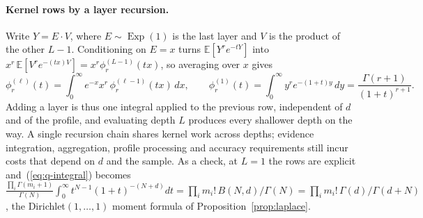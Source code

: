 \documentclass[anon]{alt2027}
\newcommand{\Exp}{\operatorname{Exp}}
\newcommand{\E}{\mathbb{E}}
\renewcommand{\eqref}[1]{(\ref{#1})}
\begin{document}
\paragraph{Kernel rows by a layer recursion.} Write $Y=E\cdot V$, where $E\sim\Exp(1)$ is the last layer and $V$ is the product of the other $L-1$. Conditioning on $E=x$ turns $\E[Y^re^{-tY}]$ into $x^r\,\E[V^re^{-(tx)V}]=x^r\phi^{(L-1)}_r(tx)$, so averaging over $x$ gives
\begin{equation}
\label{eq:phi-recursion}
\phi^{(\ell)}_r(t)=\int_0^\infty e^{-x}x^r\,\phi^{(\ell-1)}_r(tx)\,dx,\qquad \phi^{(1)}_r(t)=\int_0^\infty y^re^{-(1+t)y}\,dy=\frac{\Gamma(r+1)}{(1+t)^{r+1}} .
\end{equation}
Adding a layer is thus one integral applied to the previous row, independent of $d$ and of the profile, and evaluating depth $L$ produces every shallower depth on the way. A single recursion chain shares kernel work across depths; evidence integration, aggregation, profile processing and accuracy requirements still incur costs that depend on $d$ and the sample. As a check, at $L=1$ the rows are explicit and~\eqref{eq:q-integral} becomes $\frac{\prod_i\Gamma(m_i+1)}{\Gamma(N)}\int_0^\infty t^{N-1}(1+t)^{-(N+d)}dt=\prod_im_i!\,B(N,d)/\Gamma(N)=\prod_im_i!\,\Gamma(d)/\Gamma(d+N)$, the Dirichlet$(1,\dots,1)$ moment formula of Proposition~\ref{prop:laplace}.
\end{document}

